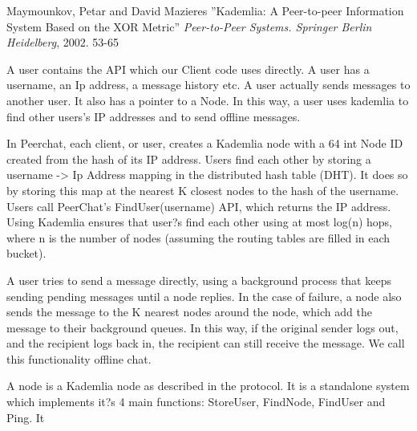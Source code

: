 \documentclass{article}
\begin{document}
\begin{thebibliography}{99}
   Maymounkov, Petar and David Mazieres
   ''Kademlia: A Peer-to-peer Information System Based on the XOR Metric''
   \textit{Peer-to-Peer Systems. Springer Berlin Heidelberg}, 2002. 53-65
 
\end{thebibliography}

A user contains the API which our Client code uses directly. A user has a username, an Ip address, a message history etc. A user actually sends messages to another user. It also has a pointer to a Node. In this way, a user uses kademlia to find other users's IP addresses and to send offline messages.

In Peerchat, each client, or user, creates a Kademlia node with a 64 int Node ID created from the hash of its IP address. Users find each other by storing a username -> Ip Address mapping in the distributed hash table (DHT). It does so by storing this map at the nearest K closest nodes to the hash of the username. Users call PeerChat's FindUser(username) API, which returns the IP address. Using Kademlia ensures that user?s find each other using at most log(n) hops, where n is the number of nodes (assuming the routing tables are filled in each bucket). 

A user tries to send a message directly, using a background process that keeps sending pending messages until a node replies. In the case of failure, a node also sends the message to the K nearest nodes around the node, which add the message to their background queues. In this way, if the original sender logs out, and the recipient logs back in, the recipient can still receive the message. We call this functionality offline chat.

A node is a Kademlia node as described in the protocol. It is a standalone system which implements it?s 4 main functions: StoreUser, FindNode, FindUser and Ping. It 
\end{document}
